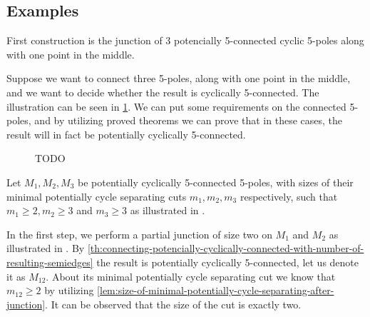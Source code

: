 \documentclass[12pt, twoside]{book}
\begin{document}
\subsection{Examples}

First construction is the junction of 3 potencially 5-connected cyclic 5-poles along with one point in the middle.

\begin{example}
	Suppose we want to connect three 5-poles, along with one point in the middle, and we want to decide whether the result is cyclically 5-connected. The illustration can be seen in \cref{fig:3-5-poles-connected}. We can put some requirements on the connected 5-poles, and by utilizing proved theorems we can prove that in these cases, the result will in fact be potentially cyclically 5-connected.
	
	\begin{figure}
		\centering
		\caption{TODO}
		\label{fig:3-5-poles-connected}
	\end{figure}
	
	Let $M_1,M_2,M_3$ be potentially cyclically 5-connected 5-poles, with sizes of their minimal potentially cycle separating cuts $m_1,m_2,m_3$ respectively, such that $m_1\geq 2,m_2\geq 3$ and $m_3\geq 3$ as illustrated in .
	
	In the first step, we perform a partial junction of size two on $M_1$ and $M_2$ as illustrated in . By \cref{th:connecting-potencially-cyclically-connected-with-number-of-resulting-semiedges} the result is potentially cyclically 5-connected, let us denote it as $M_{12}$. About its minimal potentially cycle separating cut we know that $m_{12}\geq 2$ by utilizing \cref{lem:size-of-minimal-potentially-cycle-separating-after-junction}. It can be observed that the size of the cut is exactly two.
	

\end{example}
\end{document}
